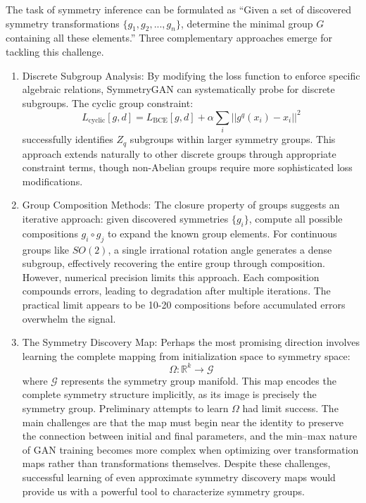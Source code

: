             The task of symmetry inference can be formulated as ``Given a set of discovered symmetry transformations \(\{g_1, g_2, ..., g_n\}\), determine the minimal group \(G\) containing all these elements.''
            Three complementary approaches emerge for tackling this challenge.
            \begin{enumerate}
                \item Discrete Subgroup Analysis: By modifying the loss function to enforce specific algebraic relations, SymmetryGAN can systematically probe for discrete subgroups.
                The cyclic group constraint:
                \[
                    L_{\text{cyclic}}[g,d] = L_{\text{BCE}}[g,d] + \alpha \sum_i ||g^q(x_i) - x_i||^2
                \]
                successfully identifies \(Z_q\) subgroups within larger symmetry groups.
                This approach extends naturally to other discrete groups through appropriate constraint terms, though non-Abelian groups require more sophisticated loss modifications.
                \item Group Composition Methods: The closure property of groups suggests an iterative approach: given discovered symmetries \(\{g_i\}\), compute all possible compositions \(g_i \circ g_j\) to expand the known group elements.
                For continuous groups like \(SO(2)\), a single irrational rotation angle generates a dense subgroup, effectively recovering the entire group through composition.
                However, numerical precision limits this approach.
                Each composition compounds errors, leading to degradation after multiple iterations.
                The practical limit appears to be 10-20 compositions before accumulated errors overwhelm the signal.
                \item The Symmetry Discovery Map: Perhaps the most promising direction involves learning the complete mapping from initialization space to symmetry space:
                \[
                    \Omega: \mathbb{R}^k \rightarrow \mathcal{G}
                \]
                where \(\mathcal{G}\) represents the symmetry group manifold.
                This map encodes the complete symmetry structure implicitly, as its image is precisely the symmetry group.
                Preliminary attempts to learn \(\Omega\) had limit success.
                The main challenges are that the map must begin near the identity to preserve the connection between initial and final parameters, and the min--max nature of GAN training becomes more complex when optimizing over transformation maps rather than transformations themselves.
                Despite these challenges, successful learning of even approximate symmetry discovery maps would provide us with a powerful tool to characterize symmetry groups.
            \end{enumerate}

